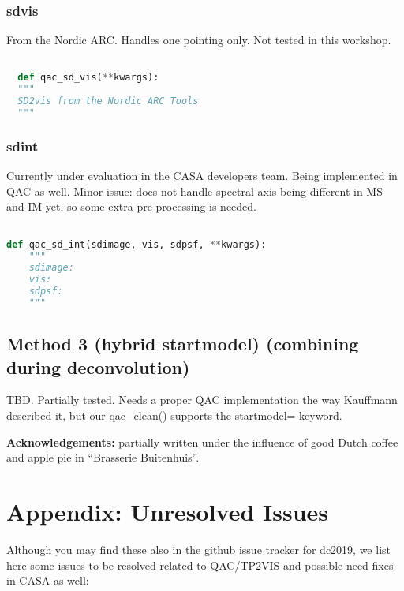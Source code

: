 \documentclass[12pt,a4paper]{article}
\begin{document}
\subsubsection{sdvis}

From the Nordic ARC. Handles one pointing only. Not tested in this workshop.

\begin{lstlisting}[language=Python]

  def qac_sd_vis(**kwargs):
  """
  SD2vis from the Nordic ARC Tools
  """

\end{lstlisting}


\subsubsection{sdint}

Currently under evaluation in the CASA developers team.  Being implemented in QAC as well.
Minor issue: does not handle spectral axis being different in MS and IM yet, so some extra pre-processing
is needed.

\begin{lstlisting}[language=Python]

def qac_sd_int(sdimage, vis, sdpsf, **kwargs):
    """
    sdimage:
    vis:
    sdpsf:
    """

\end{lstlisting}


\subsection{Method 3 (hybrid startmodel) (combining during deconvolution)}

TBD. Partially tested. Needs a proper QAC implementation the way Kauffmann described it, but our qac\_clean() supports the
startmodel= keyword.

\bigskip
{\bf Acknowledgements:} partially written under the influence of good Dutch coffee and apple pie in ``Brasserie Buitenhuis''.

\clearpage
\section{Appendix: Unresolved Issues}

Although you may find these also in the github issue tracker for dc2019, we list here some issues to be resolved related to QAC/TP2VIS
and possible need fixes in CASA as well:
\end{document}
